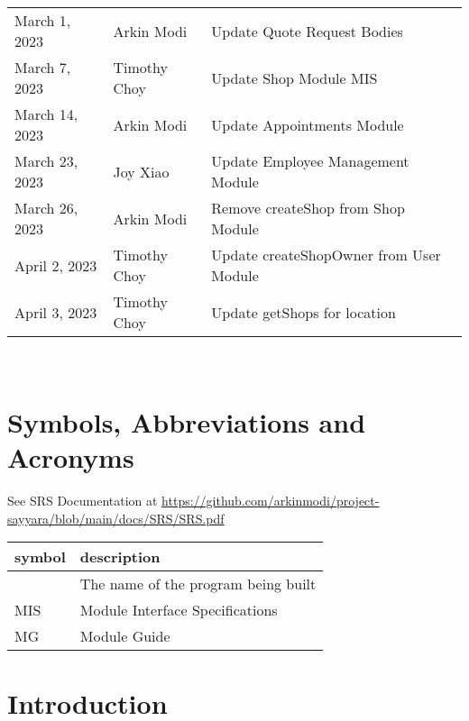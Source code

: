 \documentclass[12pt, titlepage]{article}
\begin{document}
\begin{table}[hp]
\begin{tabularx}{\textwidth}{llX}
		March 1, 2023     & Arkin Modi            & Update Quote Request Bodies              \\
		March 7, 2023     & Timothy Choy          & Update Shop Module MIS                   \\
		March 14, 2023    & Arkin Modi            & Update Appointments Module               \\
		March 23, 2023    & Joy Xiao              & Update Employee Management Module        \\
		March 26, 2023    & Arkin Modi            & Remove createShop from Shop Module       \\
		April 2, 2023     & Timothy Choy          & Update createShopOwner from User Module  \\
		April 3, 2023     & Timothy Choy          & Update getShops for location             \\
		\bottomrule
	\end{tabularx}
\end{table}

~\newpage

\section{Symbols, Abbreviations and Acronyms}

See SRS Documentation at
\url{https://github.com/arkinmodi/project-sayyara/blob/main/docs/SRS/SRS.pdf}


\begin{tabular}{l l}
	\toprule
	\textbf{symbol} & \textbf{description}                \\
	\midrule
	\progname       & The name of the program being built \\
	MIS             & Module Interface Specifications     \\
	MG              & Module Guide                        \\
	\bottomrule
\end{tabular}

\newpage

\tableofcontents

\newpage

\listoftables

\listoffigures

\newpage


\section{Introduction}
\end{document}
